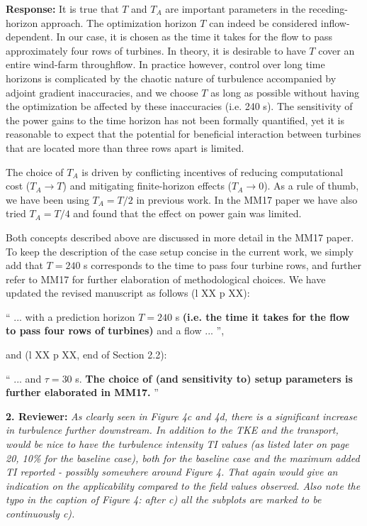 \documentclass[]{article}
\begin{document}
\textbf{Response: } It is true that $T$ and $T_A$ are important parameters in the receding-horizon approach. The optimization horizon $T$ can indeed be considered inflow-dependent. In our case, it is chosen as the time it takes for the flow to pass approximately four rows of turbines. In theory, it is desirable to have $T$ cover an entire wind-farm throughflow. In practice however, control over long time horizons is complicated by the chaotic nature of turbulence accompanied by adjoint gradient inaccuracies, and we choose $T$ as long as possible without having the optimization be affected by these inaccuracies (i.e. 240 s). The sensitivity of the power gains to the time horizon has not been formally quantified, yet it is reasonable to expect that the potential for beneficial interaction between turbines that are located more than three rows apart is limited. 

The choice of $T_A$ is driven by conflicting incentives of reducing computational cost ($T_A \rightarrow T$) and mitigating finite-horizon effects ($T_A \rightarrow 0$). As a rule of thumb, we have been using $T_A = T/2$ in previous work. In the MM17 paper we have also tried $T_A = T/4$ and found that the effect on power gain was limited.

Both concepts described above are discussed in more detail in the MM17 paper. To keep the description of the case setup concise in the current work, we simply add that $T = 240$ s corresponds to the time to pass four turbine rows, and further refer to MM17 for further elaboration of methodological choices. We have updated the revised manuscript as follows (l XX p XX): 

``
... with a prediction horizon $T = 240$ s \textbf{(i.e. the time it takes for the flow to pass four rows of turbines)} and a flow ...
'',

and (l XX p XX, end of Section 2.2):

`` 
... and $\tau = 30$ s. \textbf{The choice of (and sensitivity to) setup parameters is further elaborated in MM17.}
''

\dotfill

\textbf{2. Reviewer: } \textit{As clearly seen in Figure 4c and 4d, there is a significant increase in turbulence
	further downstream. In addition to the TKE and the transport, would be nice to have the
	turbulence intensity TI values (as listed later on page 20, 10\% for the baseline case),
	both for the baseline case and the maximum added TI reported - possibly somewhere
	around Figure 4. That again would give an indication on the applicability compared to
	the field values observed. Also note the typo in the caption of Figure 4: after c) all the
	subplots are marked to be continuously c).}
\end{document}

